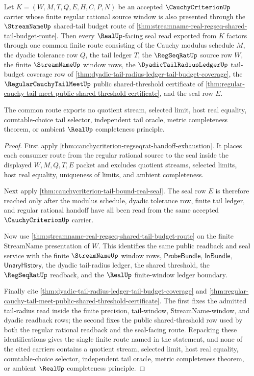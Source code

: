 \begin{theorem}
\label{thm:cauchycriterion-budgeted-shared-tail-seal-compatibility}
Let $K=(W,M,T,Q,E,H,C,P,N)$ be an accepted $\CauchyCriterionUp$ carrier whose finite regular rational source window is also presented through the $\StreamNameUp$ shared-tail budget route of \autoref{thm:streamname-real-regseq-shared-tail-budget-route}. Then every $\RealUp$-facing seal read exported from $K$ factors through one common finite route consisting of the Cauchy modulus schedule $M$, the dyadic tolerance row $Q$, the tail ledger $T$, the $\RegSeqRatUp$ source row $W$, the finite $\StreamNameUp$ window rows, the $\DyadicTailRadiusLedgerUp$ tail-budget coverage row of \autoref{thm:dyadic-tail-radius-ledger-tail-budget-coverage}, the $\RegularCauchyTailMeetUp$ public shared-threshold certificate of \autoref{thm:regular-cauchy-tail-meet-public-shared-threshold-certificate}, and the seal row $E$.

The common route exports no quotient stream, selected limit, host real equality, countable-choice tail selector, independent tail oracle, metric completeness theorem, or ambient $\RealUp$ completeness principle.
\end{theorem}
\begin{proof}
First apply \autoref{thm:cauchycriterion-regseqrat-handoff-exhaustion}. It places each consumer route from the regular rational source to the seal inside the displayed $W,M,Q,T,E$ packet and excludes quotient streams, selected limits, host real equality, uniqueness of limits, and ambient completeness.

Next apply \autoref{thm:cauchycriterion-tail-bound-real-seal}. The seal row $E$ is therefore reached only after the modulus schedule, dyadic tolerance row, finite tail ledger, and regular rational handoff have all been read from the same accepted $\CauchyCriterionUp$ carrier.

Now use \autoref{thm:streamname-real-regseq-shared-tail-budget-route} on the finite StreamName presentation of $W$. This identifies the same public readback and seal service with the finite $\StreamNameUp$ window rows, $\mathsf{ProbeBundle}$, $\mathsf{InBundle}$, $\mathsf{UnaryHistory}$, the dyadic tail-radius ledger, the shared threshold, the $\RegSeqRatUp$ readback, and the $\RealUp$ finite-window ledger boundary.

Finally cite \autoref{thm:dyadic-tail-radius-ledger-tail-budget-coverage} and \autoref{thm:regular-cauchy-tail-meet-public-shared-threshold-certificate}. The first fixes the admitted tail-radius read inside the finite precision, tail-window, StreamName-window, and dyadic readback rows; the second fixes the public shared-threshold row used by both the regular rational readback and the seal-facing route. Repacking these identifications gives the single finite route named in the statement, and none of the cited carriers contains a quotient stream, selected limit, host real equality, countable-choice selector, independent tail oracle, metric completeness theorem, or ambient $\RealUp$ completeness principle.
\end{proof}

